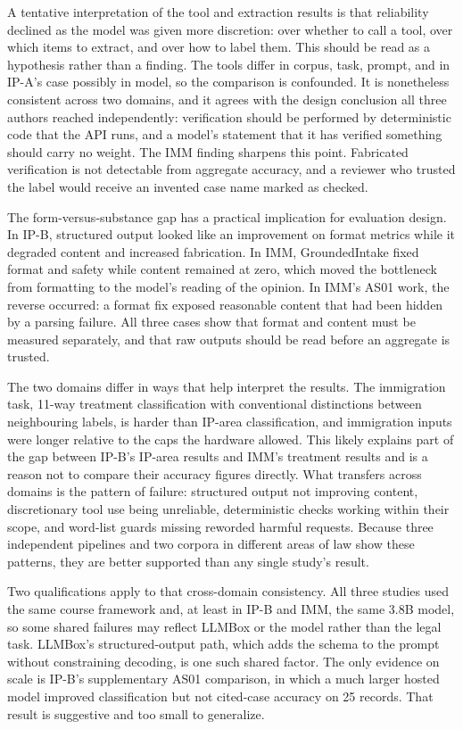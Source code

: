 \documentclass[10pt,letterpaper]{article}
\begin{document}
A tentative interpretation of the tool and extraction results is that reliability declined as the model was given more discretion: over whether to call a tool, over which items to extract, and over how to label them. This should be read as a hypothesis rather than a finding. The tools differ in corpus, task, prompt, and in IP-A's case possibly in model, so the comparison is confounded. It is nonetheless consistent across two domains, and it agrees with the design conclusion all three authors reached independently: verification should be performed by deterministic code that the API runs, and a model's statement that it has verified something should carry no weight. The IMM finding sharpens this point. Fabricated verification is not detectable from aggregate accuracy, and a reviewer who trusted the label would receive an invented case name marked as checked.

The form-versus-substance gap has a practical implication for evaluation design. In IP-B, structured output looked like an improvement on format metrics while it degraded content and increased fabrication. In IMM, GroundedIntake fixed format and safety while content remained at zero, which moved the bottleneck from formatting to the model's reading of the opinion. In IMM's AS01 work, the reverse occurred: a format fix exposed reasonable content that had been hidden by a parsing failure. All three cases show that format and content must be measured separately, and that raw outputs should be read before an aggregate is trusted.

The two domains differ in ways that help interpret the results. The immigration task, 11-way treatment classification with conventional distinctions between neighbouring labels, is harder than IP-area classification, and immigration inputs were longer relative to the caps the hardware allowed. This likely explains part of the gap between IP-B's IP-area results and IMM's treatment results and is a reason not to compare their accuracy figures directly. What transfers across domains is the pattern of failure: structured output not improving content, discretionary tool use being unreliable, deterministic checks working within their scope, and word-list guards missing reworded harmful requests. Because three independent pipelines and two corpora in different areas of law show these patterns, they are better supported than any single study's result.

Two qualifications apply to that cross-domain consistency. All three studies used the same course framework and, at least in IP-B and IMM, the same 3.8B model, so some shared failures may reflect LLMBox or the model rather than the legal task. LLMBox's structured-output path, which adds the schema to the prompt without constraining decoding, is one such shared factor. The only evidence on scale is IP-B's supplementary AS01 comparison, in which a much larger hosted model improved classification but not cited-case accuracy on 25 records. That result is suggestive and too small to generalize.
\end{document}
